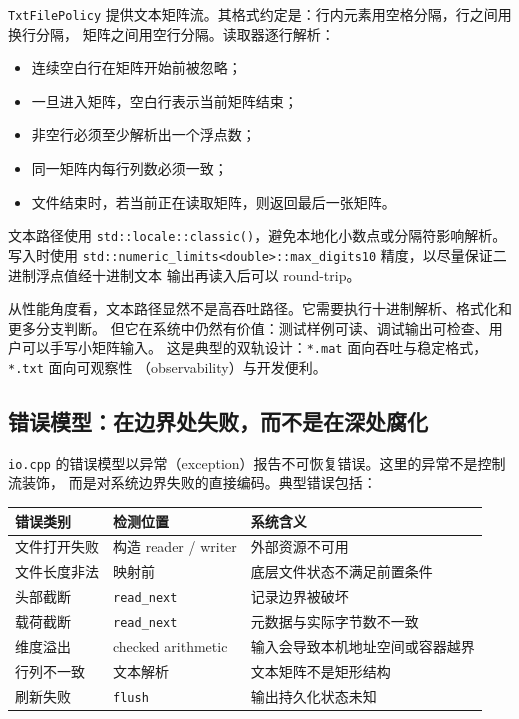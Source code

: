 \texttt{TxtFilePolicy} 提供文本矩阵流。其格式约定是：行内元素用空格分隔，行之间用换行分隔，
矩阵之间用空行分隔。读取器逐行解析：

\begin{itemize}
    \item 连续空白行在矩阵开始前被忽略；
    \item 一旦进入矩阵，空白行表示当前矩阵结束；
    \item 非空行必须至少解析出一个浮点数；
    \item 同一矩阵内每行列数必须一致；
    \item 文件结束时，若当前正在读取矩阵，则返回最后一张矩阵。
\end{itemize}

文本路径使用 \texttt{std::locale::classic()}，避免本地化小数点或分隔符影响解析。
写入时使用 \texttt{std::numeric\_limits<double>::max\_digits10} 精度，以尽量保证二进制浮点值经十进制文本
输出再读入后可以 round-trip。

从性能角度看，文本路径显然不是高吞吐路径。它需要执行十进制解析、格式化和更多分支判断。
但它在系统中仍然有价值：测试样例可读、调试输出可检查、用户可以手写小矩阵输入。
这是典型的双轨设计：\texttt{*.mat} 面向吞吐与稳定格式，\texttt{*.txt} 面向可观察性
（observability）与开发便利。

\subsection{错误模型：在边界处失败，而不是在深处腐化}

\texttt{io.cpp} 的错误模型以异常（exception）报告不可恢复错误。这里的异常不是控制流装饰，
而是对系统边界失败的直接编码。典型错误包括：

\begin{table}[htbp]
    \centering
    \begin{tabular}{lll}
        \toprule
        错误类别   & 检测位置                & 系统含义             \\
        \midrule
        文件打开失败 & 构造 reader / writer  & 外部资源不可用          \\
        文件长度非法 & 映射前                 & 底层文件状态不满足前置条件    \\
        头部截断   & \texttt{read\_next} & 记录边界被破坏          \\
        载荷截断   & \texttt{read\_next} & 元数据与实际字节数不一致     \\
        维度溢出   & checked arithmetic  & 输入会导致本机地址空间或容器越界 \\
        行列不一致  & 文本解析                & 文本矩阵不是矩形结构       \\
        刷新失败   & \texttt{flush}      & 输出持久化状态未知        \\
        \bottomrule
    \end{tabular}
\end{table}

